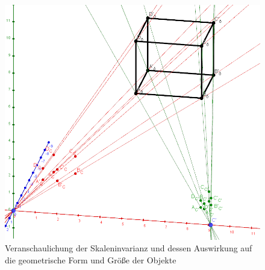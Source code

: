 \begin{figure}[!htb]
	\centering
	\includegraphics[width=0.40\linewidth]{images/ScaleInvariance_3.png}
	\caption[Skalierung der Rekonstruierten Szene]{Veranschaulichung der Skaleninvarianz und dessen Auswirkung auf die geometrische Form und Größe der Objekte} 
	\label{fig:scale3}
\end{figure}
\pagebreak



